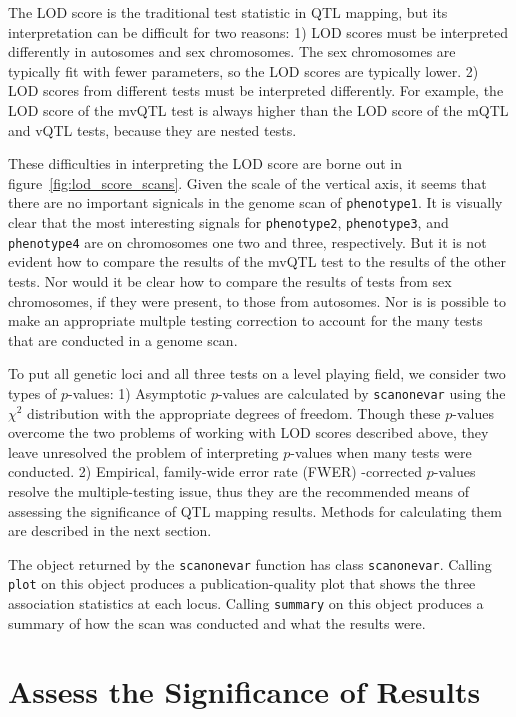 \documentclass[9pt,twocolumn,twoside]{gsag3jnl}
\begin{document}
The LOD score is the traditional test statistic in QTL mapping, but its interpretation can be difficult for two reasons:
1) LOD scores must be interpreted differently in autosomes and sex chromosomes.  The sex chromosomes are typically fit with fewer parameters, so the LOD scores are typically lower.
2) LOD scores from different tests must be interpreted differently.  For example, the LOD score of the mvQTL test is always higher than the LOD score of the mQTL and vQTL tests, because they are nested tests.

These difficulties in interpreting the LOD score are borne out in figure~\ref{fig:lod_score_scans}.
Given the scale of the vertical axis, it seems that there are no important signicals in the genome scan of \texttt{phenotype1}.
It is visually clear that the most interesting signals for \texttt{phenotype2}, \texttt{phenotype3}, and \texttt{phenotype4} are on chromosomes one two and three, respectively.
But it is not evident how to compare the results of the mvQTL test to the results of the other tests.
Nor would it be clear how to compare the results of tests from sex chromosomes, if they were present, to those from autosomes.
Nor is is possible to make an appropriate multple testing correction to account for the many tests that are conducted in a genome scan.

To put all genetic loci and all three tests on a level playing field, we consider two types of $p$-values:
1) Asymptotic $p$-values are calculated by \texttt{scanonevar} using the $\chi^2$ distribution with the appropriate degrees of freedom.  Though these $p$-values overcome the two problems of working with LOD scores described above, they leave unresolved the problem of interpreting $p$-values when many tests were conducted.
2) Empirical, family-wide error rate (FWER) -corrected $p$-values resolve the multiple-testing issue, thus they are the recommended means of assessing the significance of QTL mapping results.  Methods for calculating them are described in the next section.

The object returned by the \texttt{scanonevar} function has class \texttt{scanonevar}.
Calling \texttt{plot} on this object produces a publication-quality plot that shows the three association statistics at each locus.
Calling \texttt{summary} on this object produces a summary of how the scan was conducted and what the results were.





\section*{Assess the Significance of Results}
\end{document}
